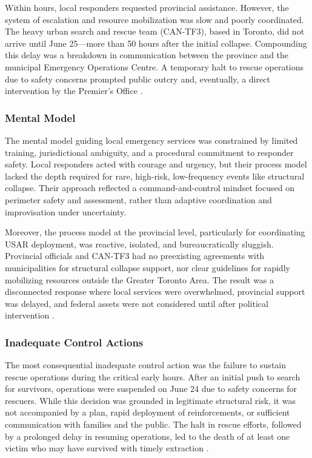 \documentclass[12pt]{article}
\begin{document}
Within hours, local responders requested provincial assistance. However, the system of escalation and resource mobilization was slow and poorly coordinated. The heavy urban search and rescue team (CAN-TF3), based in Toronto, did not arrive until June 25—more than 50 hours after the initial collapse. Compounding this delay was a breakdown in communication between the province and the municipal Emergency Operations Centre. A temporary halt to rescue operations due to safety concerns prompted public outcry and, eventually, a direct intervention by the Premier’s Office \cite[p284–288]{AlgoLakeReport1}.

\subsubsection*{Mental Model}

The mental model guiding local emergency services was constrained by limited training, jurisdictional ambiguity, and a procedural commitment to responder safety. Local responders acted with courage and urgency, but their process model lacked the depth required for rare, high-risk, low-frequency events like structural collapse. Their approach reflected a command-and-control mindset focused on perimeter safety and assessment, rather than adaptive coordination and improvisation under uncertainty.

Moreover, the process model at the provincial level, particularly for coordinating USAR deployment, was reactive, isolated, and bureaucratically sluggish. Provincial officials and CAN-TF3 had no preexisting agreements with municipalities for structural collapse support, nor clear guidelines for rapidly mobilizing resources outside the Greater Toronto Area. The result was a disconnected response where local services were overwhelmed, provincial support was delayed, and federal assets were not considered until after political intervention \cite[p284–289]{AlgoLakeReport1}.

\subsubsection*{Inadequate Control Actions}

The most consequential inadequate control action was the failure to sustain rescue operations during the critical early hours. After an initial push to search for survivors, operations were suspended on June 24 due to safety concerns for rescuers. While this decision was grounded in legitimate structural risk, it was not accompanied by a plan, rapid deployment of reinforcements, or sufficient communication with families and the public. The halt in rescue efforts, followed by a prolonged delay in resuming operations, led to the death of at least one victim who may have survived with timely extraction \cite[p286–288]{AlgoLakeReport1}.
\end{document}
